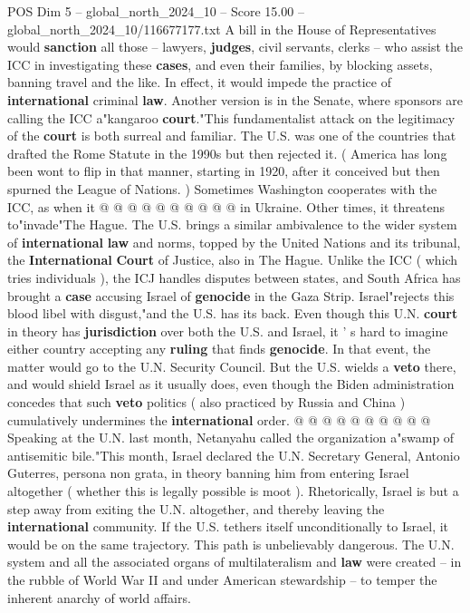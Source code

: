 \begin{textsample}{POS Dim 5 – global\_north\_2024\_10 – Score 15.00 – global\_north\_2024\_10/116677177.txt}
A bill in the House of Representatives would \textbf{sanction} all those -- lawyers, \textbf{judges}, civil servants, clerks -- who assist the ICC in investigating these \textbf{cases}, and even their families, by blocking assets, banning travel and the like.
In effect, it would impede the practice of \textbf{international} criminal \textbf{law}.
Another version is in the Senate, where sponsors are calling the ICC a"kangaroo \textbf{court}."This fundamentalist attack on the legitimacy of the \textbf{court} is both surreal and familiar.
The U.S. was one of the countries that drafted the Rome Statute in the 1990s but then rejected it. ( America has long been wont to flip in that manner, starting in 1920, after it conceived but then spurned the League of Nations. ) Sometimes Washington cooperates with the ICC, as when it @ @ @ @ @ @ @ @ @ @ in Ukraine.
Other times, it threatens to"invade"The Hague.
The U.S. brings a similar ambivalence to the wider system of \textbf{international} \textbf{law} and norms, topped by the United Nations and its tribunal, the \textbf{International} \textbf{Court} of Justice, also in The Hague.
Unlike the ICC ( which tries individuals ), the ICJ handles disputes between states, and South Africa has brought a \textbf{case} accusing Israel of \textbf{genocide} in the Gaza Strip.
Israel"rejects this blood libel with disgust,"and the U.S. has its back.
Even though this U.N. \textbf{court} in theory has \textbf{jurisdiction} over both the U.S. and Israel, it ' s hard to imagine either country accepting any \textbf{ruling} that finds \textbf{genocide}.
In that event, the matter would go to the U.N.
Security Council.
But the U.S. wields a \textbf{veto} there, and would shield Israel as it usually does, even though the Biden administration concedes that such \textbf{veto} politics ( also practiced by Russia and China ) cumulatively undermines the \textbf{international} order. @ @ @ @ @ @ @ @ @ @ Speaking at the U.N. last month, Netanyahu called the organization a"swamp of antisemitic bile."This month, Israel declared the U.N.
Secretary General, Antonio Guterres, persona non grata, in theory banning him from entering Israel altogether ( whether this is legally possible is moot ).
Rhetorically, Israel is but a step away from exiting the U.N. altogether, and thereby leaving the \textbf{international} community.
If the U.S. tethers itself unconditionally to Israel, it would be on the same trajectory.
This path is unbelievably dangerous.
The U.N. system and all the associated organs of multilateralism and \textbf{law} were created -- in the rubble of World War II and under American stewardship -- to temper the inherent anarchy of world affairs.

\end{textsample}
